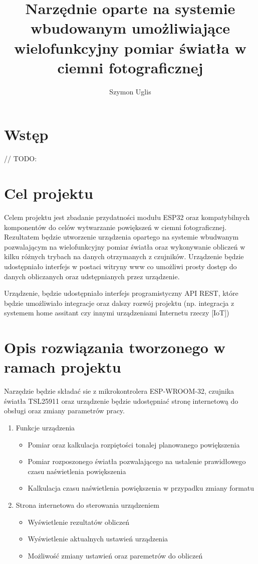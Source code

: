 \documentclass[12pt,a4paper]{article}
\title{Narzędnie oparte na systemie wbudowanym umożliwiające wielofunkcyjny pomiar światła w ciemni fotograficznej}
\author{Szymon Uglis}
\begin{document}
\begin{titlepage}
    \maketitle
\end{titlepage}

\tableofcontents{}
\pagebreak

\section{Wstęp}

// TODO:

\section{Cel projektu}

Celem projektu jest zbadanie przydatności modułu ESP32 oraz kompatybilnych komponentów do celów wytwarzanie powiększeń w ciemni fotograficznej.
Rezultatem będzie utworzenie urządzenia opartego na systemie wbudwanym pozwalającym na wielofunkcyjny pomiar światła 
oraz wykonywanie obliczeń w kilku różnych trybach na danych otrzymanych z czujników. Urządzenie będzie udostępniało interfejs w postaci witryny www co umożliwi
prosty dostęp do danych obliczanych oraz udstępnianych przez urządzenie.

Urządzenie, będzie udostępniało interfejs programistyczny API REST, które będzie umożliwiało integracje oraz dalszy rozwój projektu 
(np. integracja z systemem home assitant czy innymi urządzeniami Internetu rzeczy [IoT])

\section{Opis rozwiązania tworzonego w ramach projektu}

Narzędzie będzie składać sie z mikrokontrolera ESP-WROOM-32, czujnika światła TSL25911 oraz urządzenie będzie udostępniać stronę internetową do obsługi oraz zmiany parametrów pracy.
\begin{enumerate}
    \item Funkcje urządzenia
    \begin{itemize}
        \item Pomiar oraz kalkulacja rozpiętości tonalej planowanego powiększenia
        \item Pomiar rozposzonego światła pozwalającego na ustalenie prawidłowego czasu naświetlenia powiększenia
        \item Kalkulacja czasu naświetlenia powiększenia w przypadku zmiany formatu
    \end{itemize}
    \item Strona internetowa do sterowania urządzeniem
    \begin{itemize}
        \item Wyświetlenie rezultatów obliczeń
        \item Wyświetlenie aktualnych ustawień urządzenia
        \item Możliwość zmiany ustawień oraz paremetrów do obliczeń
    \end{itemize}
\end{enumerate}
\end{document}
